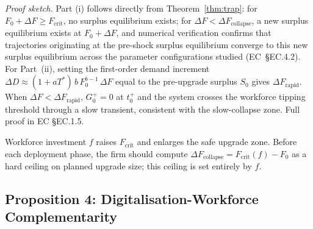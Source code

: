\documentclass[msom,dblanonrev]{informs4}
\begin{document}
\noindent\textit{Proof sketch.}
Part (i) follows directly from Theorem~\ref{thm:trap}: for $F_0+\Delta F \geq F_{\mathrm{crit}}$, no surplus equilibrium exists; for $\Delta F < \Delta F_{\mathrm{collapse}}$, a new surplus equilibrium exists at $F_0+\Delta F$, and numerical verification confirms that trajectories originating at the pre-shock surplus equilibrium converge to this new surplus equilibrium across the parameter configurations studied (EC~\S EC.4.2). For Part~(ii), setting the first-order demand increment $\Delta D \approx (1+aT^*)\,b\,F_0^{b-1}\,\Delta F$ equal to the pre-upgrade surplus $S_0$ gives $\Delta F_{\mathrm{rapid}}$. When $\Delta F < \Delta F_{\mathrm{rapid}}$, $G_0^+ = 0$ at $t_0^+$ and the system crosses the workforce tipping threshold through a slow transient, consistent with the slow-collapse zone. Full proof in EC \S EC.1.5. \Halmos

\medskip
Workforce investment $f$ raises $F_{\mathrm{crit}}$ and enlarges the safe upgrade zone. Before each deployment phase, the firm should compute $\Delta F_{\mathrm{collapse}} = F_{\mathrm{crit}}(f) - F_0$ as a hard ceiling on planned upgrade size; this ceiling is set entirely by $f$.


\subsection{Proposition 4: Digitalisation-Workforce Complementarity}\label{sec:analysis:comp}
\end{document}
